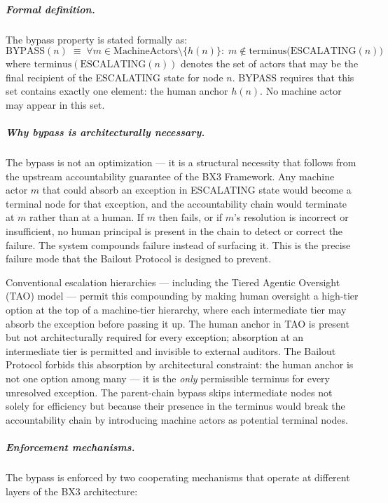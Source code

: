\subparagraph{Formal definition.} The bypass property is stated formally as:
\begin{equation}
\text{BYPASS}(n) \;\equiv\; \forall m \in \text{MachineActors} \setminus \{h(n)\}:\; m \notin \text{terminus}\bigl(\text{ESCALATING}(n)\bigr) \tag{BP}\label{eq:bypass-property}
\end{equation}
where $\text{terminus}(\text{ESCALATING}(n))$ denotes the set of actors that may be the final recipient of the ESCALATING state for node $n$. BYPASS requires that this set contains exactly one element: the human anchor $h(n)$. No machine actor may appear in this set.

\subparagraph{Why bypass is architecturally necessary.} The bypass is not an optimization — it is a structural necessity that follows from the upstream accountability guarantee of the BX3 Framework. Any machine actor $m$ that could absorb an exception in ESCALATING state would become a terminal node for that exception, and the accountability chain would terminate at $m$ rather than at a human. If $m$ then fails, or if $m$'s resolution is incorrect or insufficient, no human principal is present in the chain to detect or correct the failure. The system compounds failure instead of surfacing it. This is the precise failure mode that the Bailout Protocol is designed to prevent.

Conventional escalation hierarchies — including the Tiered Agentic Oversight (TAO) model \cite{kim2025tao} — permit this compounding by making human oversight a high-tier option at the top of a machine-tier hierarchy, where each intermediate tier may absorb the exception before passing it up. The human anchor in TAO is present but not architecturally required for every exception; absorption at an intermediate tier is permitted and invisible to external auditors. The Bailout Protocol forbids this absorption by architectural constraint: the human anchor is not one option among many — it is the \emph{only} permissible terminus for every unresolved exception. The parent-chain bypass skips intermediate nodes not solely for efficiency but because their presence in the terminus would break the accountability chain by introducing machine actors as potential terminal nodes.

\subparagraph{Enforcement mechanisms.} The bypass is enforced by two cooperating mechanisms that operate at different layers of the BX3 architecture:

